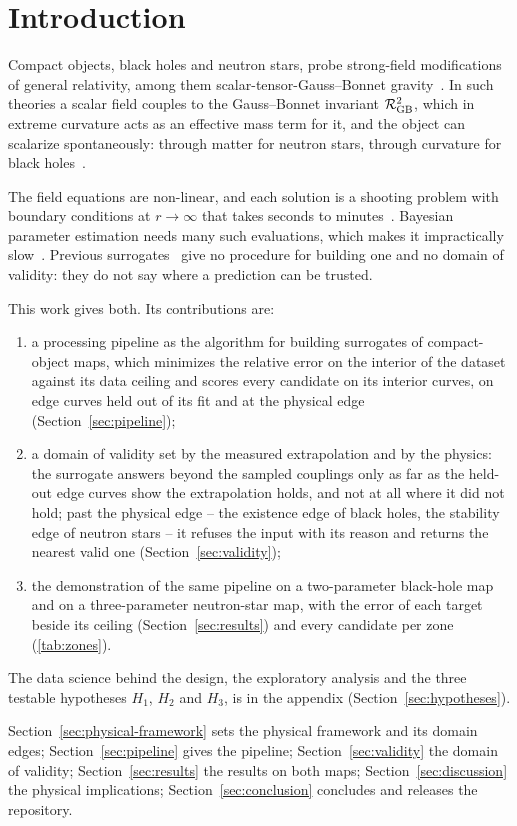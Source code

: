 \section{Introduction}
\label{sec:introduction}

Compact objects, black holes and neutron stars, probe strong-field modifications of general relativity, among them scalar-tensor-Gauss--Bonnet gravity~\citep{TODO_StrongFieldTests}. In such theories a scalar field couples to the Gauss--Bonnet invariant $\mathcal{R}^2_{\mathrm{GB}}$, which in extreme curvature acts as an effective mass term for it, and the object can scalarize spontaneously: through matter for neutron stars, through curvature for black holes~\citep{Doneva2017_BH,Doneva2017_NS,DamourEspositoFarese1993}.

The field equations are non-linear, and each solution is a shooting problem with boundary conditions at $r \to \infty$ that takes seconds to minutes~\citep{TODO_SolverCost}. Bayesian parameter estimation needs many such evaluations, which makes it impractically slow~\citep{Reed2024}. Previous surrogates~\citep{Liodis2024,Kaushikk2026,Liu2026} give no procedure for building one and no domain of validity: they do not say where a prediction can be trusted.

This work gives both. Its contributions are:
\begin{enumerate}
  \item a processing pipeline as the algorithm for building surrogates of compact-object maps, which minimizes the relative error on the interior of the dataset against its data ceiling and scores every candidate on its interior curves, on edge curves held out of its fit and at the physical edge (Section~\ref{sec:pipeline});
  \item a domain of validity set by the measured extrapolation and by the physics: the surrogate answers beyond the sampled couplings only as far as the held-out edge curves show the extrapolation holds, and not at all where it did not hold; past the physical edge -- the existence edge of black holes, the stability edge of neutron stars -- it refuses the input with its reason and returns the nearest valid one (Section~\ref{sec:validity});
  \item the demonstration of the same pipeline on a two-parameter black-hole map and on a three-parameter neutron-star map, with the error of each target beside its ceiling (Section~\ref{sec:results}) and every candidate per zone (\cref{tab:zones}).
\end{enumerate}
The data science behind the design, the exploratory analysis and the three testable hypotheses $H_1$, $H_2$ and $H_3$, is in the appendix (Section~\ref{sec:hypotheses}).

Section~\ref{sec:physical-framework} sets the physical framework and its domain edges; Section~\ref{sec:pipeline} gives the pipeline; Section~\ref{sec:validity} the domain of validity; Section~\ref{sec:results} the results on both maps; Section~\ref{sec:discussion} the physical implications; Section~\ref{sec:conclusion} concludes and releases the repository.
